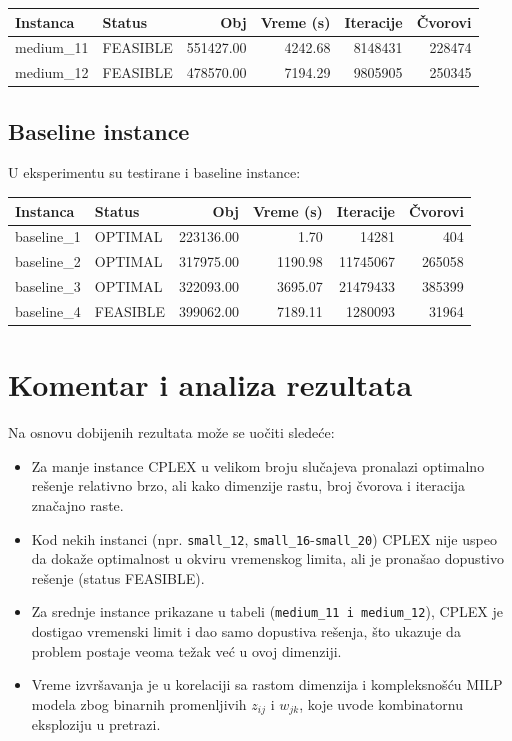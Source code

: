 \documentclass[12pt,a4paper]{article}
\begin{document}
\begin{center}
\begin{tabular}{l l r r r r}
\toprule
\textbf{Instanca} & \textbf{Status} & \textbf{Obj} & \textbf{Vreme (s)} & \textbf{Iteracije} & \textbf{Čvorovi} \\
\midrule
medium\_11 & FEASIBLE & 551427.00 & 4242.68 & 8148431 & 228474 \\
medium\_12 & FEASIBLE & 478570.00 & 7194.29 & 9805905 & 250345 \\
\bottomrule
\end{tabular}
\end{center}

\subsection{Baseline instance}
U eksperimentu su testirane i baseline instance:

\begin{center}
\begin{tabular}{l l r r r r}
\toprule
\textbf{Instanca} & \textbf{Status} & \textbf{Obj} & \textbf{Vreme (s)} & \textbf{Iteracije} & \textbf{Čvorovi} \\
\midrule
baseline\_1 & OPTIMAL  & 223136.00 & 1.70    & 14281     & 404 \\
baseline\_2 & OPTIMAL  & 317975.00 & 1190.98 & 11745067  & 265058 \\
baseline\_3 & OPTIMAL  & 322093.00 & 3695.07 & 21479433  & 385399 \\
baseline\_4 & FEASIBLE & 399062.00 & 7189.11 & 1280093   & 31964 \\
\bottomrule
\end{tabular}
\end{center}

\section{Komentar i analiza rezultata}
Na osnovu dobijenih rezultata može se uočiti sledeće:
\begin{itemize}
    \item Za manje instance CPLEX u velikom broju slučajeva pronalazi optimalno rešenje relativno brzo, ali kako dimenzije rastu, broj čvorova i iteracija značajno raste.
    
    \item Kod nekih instanci (npr. \texttt{small\_12}, \texttt{small\_16}-\texttt{small\_20}) CPLEX nije uspeo da dokaže optimalnost u okviru vremenskog limita, ali je pronašao dopustivo rešenje (status FEASIBLE).
    
    \item Za srednje instance prikazane u tabeli (\texttt{medium\_11 i medium\_12}), CPLEX je dostigao vremenski limit i dao samo dopustiva rešenja, što ukazuje da problem postaje veoma težak već u ovoj dimenziji.
    
    \item Vreme izvršavanja je u korelaciji sa rastom dimenzija i kompleksnošću MILP modela zbog binarnih promenljivih $z_{ij}$ i $w_{jk}$, koje uvode kombinatornu eksploziju u pretrazi.

\end{itemize}
\end{document}
